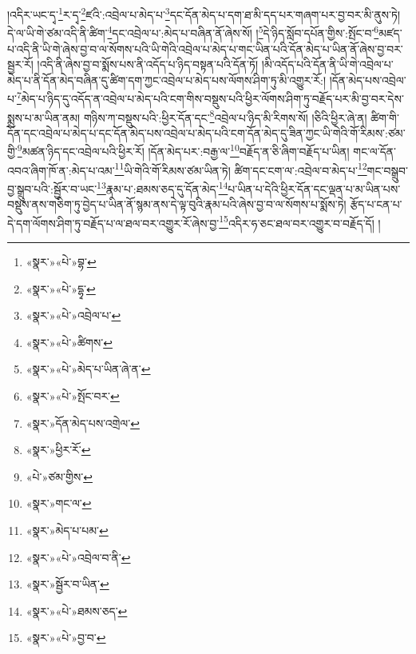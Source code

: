 །འདིར་ཡང་དྭ་\footnote{«སྣར་»«པེ་»བྷ་}ར་དྭ་\footnote{«སྣར་»«པེ་»དྷྭ་}ཛའི་:འབྲེལ་པ་མེད་པ་\footnote{«སྣར་»«པེ་»འབྲེལ་པ་}དང་དོན་མེད་པ་དག་ཐ་མི་དད་པར་གཞག་པར་བྱ་བར་མི་ནུས་ཏེ། དེ་ལ་ཡི་གེ་ཙམ་འདི་ནི་ཚིག་\footnote{«སྣར་»«པེ་»ཚིགས་}དང་འབྲེལ་པ་:མེད་པ་བཞིན་ནོ་ཞེས་སོ། །\footnote{«སྣར་»«པེ་»མེད་པ་ཡིན་ཞེ་ན་}དེ་ཉིད་སློབ་དཔོན་གྱིས་:སྤོང་བ་\footnote{«སྣར་»«པེ་»སྤོང་བར་}མཛད་པ་འདི་ནི་ཡི་གེ་ཞེས་བྱ་བ་ལ་སོགས་པའི་ཡི་གེའི་འབྲེལ་པ་མེད་པ་གང་ཡིན་པའི་དོན་མེད་པ་ཡིན་ནོ་ཞེས་བྱ་བར་སྦྱར་རོ། །འདི་ནི་ཞེས་བྱ་བ་སྨོས་པས་ནི་འདོད་པ་ཉིད་བསྟན་པའི་དོན་ཏོ། །མི་འདོད་པའི་དོན་ནི་ཡི་གེ་འབྲེལ་པ་མེད་པ་ནི་དོན་མེད་བཞིན་དུ་ཚིག་དག་ཀྱང་འབྲེལ་པ་མེད་པས་ལོགས་ཤིག་ཏུ་མི་འགྱུར་རོ:། །དོན་མེད་པས་འབྲེལ་པ་\footnote{«སྣར་»དོན་མེད་པས་འགྲེལ་}མེད་པ་ཉིད་དུ་འདོད་ན་འབྲེལ་པ་མེད་པའི་ངག་གིས་བསྡུས་པའི་ཕྱིར་ལོགས་ཤིག་ཏུ་བརྗོད་པར་མི་བྱ་བར་དེས་སྨྲས་པ་མ་ཡིན་ནམ། གཉིས་ཀ་བསྡུས་པའི་:ཕྱིར་དོན་དང་\footnote{«སྣར་»ཕྱིར་རོ་}འབྲེལ་པ་ཉིད་མི་རིགས་སོ། །ཅིའི་ཕྱིར་ཞེ་ན། ཚིག་གི་དོན་དང་འབྲེལ་པ་མེད་པ་དང་དོན་མེད་པས་འབྲེལ་པ་མེད་པའི་ངག་དོན་མེད་དུ་ཟིན་ཀྱང་ཡི་གེའི་གོ་རིམས་:ཙམ་གྱི་\footnote{«པེ་»ཙམ་གྱིས་}མཚན་ཉིད་དང་འབྲེལ་པའི་ཕྱིར་རོ། །དོན་མེད་པར་:བརྒྱ་ལ་\footnote{«སྣར་»གང་ལ་}བརྗོད་ན་ཅི་ཞིག་བརྗོད་པ་ཡིན། གང་ལ་དོན་འབའ་ཞིག་ཁོ་ན་:མེད་པ་འམ་\footnote{«སྣར་»མེད་པ་པམ་}ཡི་གེའི་གོ་རིམས་ཙམ་ཡིན་ཏེ། ཚིག་དང་ངག་ལ་:འབྲེལ་བ་མེད་པ་\footnote{«སྣར་»«པེ་»འབྲེལ་བ་ནི་}གང་བསྒྲུབ་བྱ་སྒྲུབ་པའི་:སྦྱོར་བ་ཡང་\footnote{«སྣར་»སྦྱོར་བ་ཡིན་}རྣམ་པ་:ཐམས་ཅད་དུ་དོན་མེད་\footnote{«སྣར་»«པེ་»ཐམས་ཅད་}པ་ཡིན་པ་དེའི་ཕྱིར་དོན་དང་ལྡན་པ་མ་ཡིན་པས་བསྡུས་ནས་གཅིག་ཏུ་བྱེད་པ་ཡིན་ནོ་སྙམ་ནས་དེ་ལྟ་བུའི་རྣམ་པའི་ཞེས་བྱ་བ་ལ་སོགས་པ་སྨོས་ཏེ། རྩོད་པ་ངན་པ་དེ་དག་ལོགས་ཤིག་ཏུ་བརྗོད་པ་ལ་ཐལ་བར་འགྱུར་རོ་ཞེས་བྱ་\footnote{«སྣར་»«པེ་»བྱ་བ་}འདིར་ཧ་ཅང་ཐལ་བར་འགྱུར་བ་བརྗོད་དོ། །
